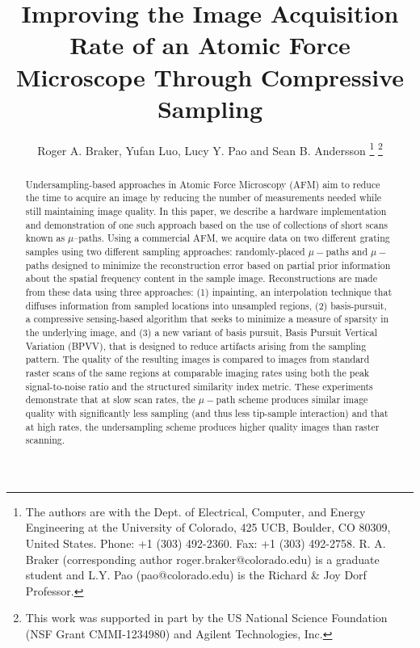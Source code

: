 \documentclass[twocolumn,twoside]{IEEEtran/IEEEtran}
\begin{document}
\title{Improving the Image Acquisition Rate of an Atomic Force Microscope Through Compressive Sampling}

\author{Roger A. Braker, Yufan Luo, Lucy Y. Pao and Sean B. Andersson
  \thanks{The authors are with the Dept. of Electrical, Computer, and Energy
    Engineering at the University of Colorado, 425 UCB, Boulder, CO 80309,
    United States. Phone: +1 (303) 492-2360. Fax: +1 (303) 492-2758. R. A.
    Braker (corresponding author roger.braker@colorado.edu) is a graduate
    student and L.Y. Pao (pao@colorado.edu) is the Richard \& Joy Dorf
    Professor.} \thanks{This work was supported in part by the US National
    Science Foundation (NSF Grant CMMI-1234980) and Agilent Technologies, Inc.}
}

\maketitle
\begin{abstract}
  Undersampling-based approaches in Atomic Force Microscopy (AFM) aim to reduce
  the time to acquire an image by reducing the number of measurements needed
  while still maintaining image quality. In this paper, we describe a hardware
  implementation and demonstration of one such approach based on the use of
  collections of short scans known as $\mu$--paths. Using a commercial AFM, we
  acquire data on two different grating samples using two different sampling
  approaches: randomly-placed $\mu-$paths and $\mu-$paths designed to minimize
  the reconstruction error based on partial prior information about the spatial
  frequency content in the sample image. Reconstructions are made from these
  data using three approaches: (1) inpainting, an interpolation technique that
  diffuses information from sampled locations into unsampled regions, (2)
  basis-pursuit, a compressive sensing-based algorithm that seeks to minimize a
  measure of sparsity in the underlying image, and (3) a new variant of basis
  pursuit, Basis Pursuit Vertical Variation (BPVV), that is designed to reduce
  artifacts arising from the sampling pattern. The quality of the resulting
  images is compared to images from standard raster scans of the same regions at
  comparable imaging rates using both the peak signal-to-noise ratio and the
  structured similarity index metric. These experiments demonstrate that at slow
  scan rates, the $\mu-$path scheme produces similar image quality with
  significantly less sampling (and thus less tip-sample interaction) and that at
  high rates, the undersampling scheme produces higher quality images than
  raster scanning.
\end{abstract}
\end{document}
